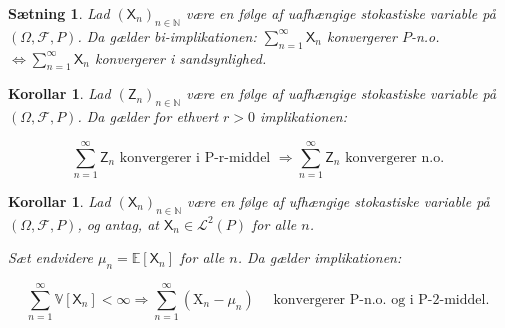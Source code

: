 \documentclass{article}
\newcommand{\1}{\mathbbm{1}}
\newtheorem{corollary}[theorem]{Korollar}
\newtheorem{proposition}[theorem]{Sætning}
\theoremstyle{boxed}
\begin{document}
\begin{theorem-box}
    \begin{proposition}
        Lad $\left(\mathsf{X}_n\right)_{n \in \mathbb{N}}$ være en følge af uafhængige stokastiske variable på $(\Omega, \mathcal{F}, P)$.
Da gælder bi-implikationen:
$\sum_{n=1}^{\infty} \mathsf{X}_n$ konvergerer $P$-n.o. $\Longleftrightarrow \sum_{n=1}^{\infty} \mathsf{X}_n$ konvergerer i sandsynlighed.
    \end{proposition}
\end{theorem-box}
\begin{theorem-box}
    \begin{corollary}
        Lad $\left(\mathsf{Z}_n\right)_{n \in \mathbb{N}}$ være en følge af uafhængige stokastiske variable på $(\Omega, \mathcal{F}, P)$.
Da gælder for ethvert $r>0$ implikationen:

$$
\sum_{n=1}^{\infty} \mathsf{Z}_n \text { konvergerer i P-r-middel } \Longrightarrow \sum_{n=1}^{\infty} \mathsf{Z}_n \text { konvergerer n.o. }
$$

    \end{corollary}
\end{theorem-box}
\begin{theorem-box}
    \begin{corollary}
        Lad $\left(\mathsf{X}_n\right)_{n \in \mathbb{N}}$ være en følge af ufhængige stokastiske variable på $(\Omega, \mathcal{F}, P)$, og antag, at $\mathsf{X}_n \in \mathcal{L}^2(P)$ for alle $n$.

Sæt endvidere $\mu_n=\mathbb{E}\left[\mathsf{X}_n\right]$ for alle $n$.
Da gælder implikationen:

$$
\sum_{n=1}^{\infty} \mathbb{V}\left[\mathsf{X}_n\right]<\infty \Longrightarrow \sum_{n=1}^{\infty}\left(\mathrm{X}_n-\mu_n\right) \quad \text { konvergerer P-n.o. og i P-2-middel. }
$$

    \end{corollary}
\end{theorem-box}
\end{document}
